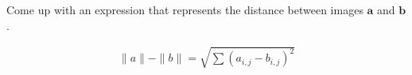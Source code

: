 Come up with an expression that represents the distance between images $\boldsymbol{a}$ and $\boldsymbol{b}$.

\begin{solution}
    \begin{align*}
        \|a\| - \|b\| = \sqrt{\sum \left(a_{i,j} - b_{i,j}\right)^2}
    \end{align*}
\end{solution}